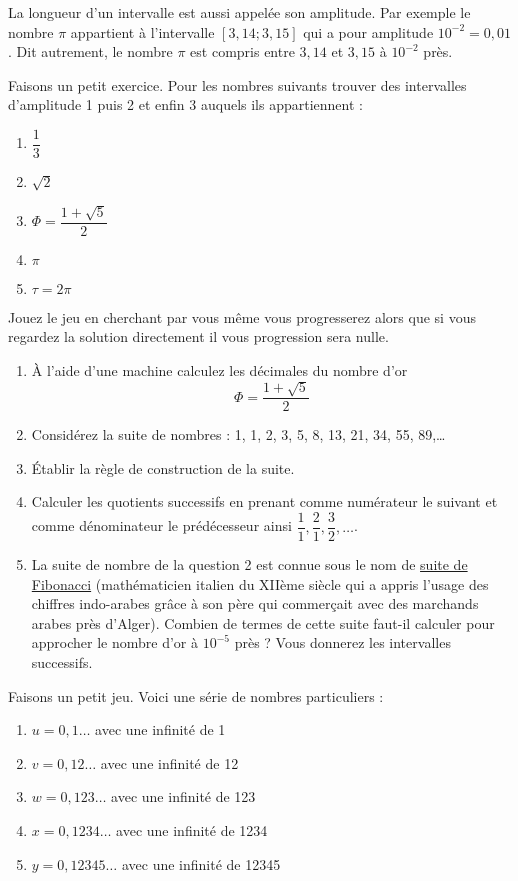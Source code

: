 \documentclass[11pt]{article}
\begin{document}
La longueur d'un intervalle est aussi appelée son amplitude. Par
exemple le nombre \(\pi\) appartient à l'intervalle \([3,14 ; 3,15]\)
qui a pour amplitude \(10^{-2} = 0,01\). Dit autrement, le nombre
\(\pi\) est compris entre \(3,14\) et \(3,15\) à \(10^{-2}\) près.

Faisons un petit exercice. Pour les nombres suivants trouver des
intervalles d'amplitude 1 puis 2 et enfin 3 auquels ils appartiennent :
\begin{enumerate}
\item \(\dfrac{1}{3}\)
\item \(\sqrt{2}\)
\item \(\Phi = \dfrac{1 + \sqrt{5}}{2}\)
\item \(\pi\)
\item \(\tau = 2\pi\)
\end{enumerate}

Jouez le jeu en cherchant par vous même vous progresserez alors que
si vous regardez la solution directement il vous progression sera
nulle.

\begin{enumerate}
\item À l'aide d'une machine calculez les décimales du nombre d'or
\[\Phi = \dfrac{1 + \sqrt{5}}{2}\]
\item Considérez la suite de nombres : 1, 1, 2, 3, 5, 8, 13, 21, 34,
55, 89,\ldots{}
\item Établir la règle de construction de la suite.
\item Calculer les quotients successifs en prenant comme numérateur le
suivant et comme dénominateur le prédécesseur ainsi
\(\dfrac{1}{1}, \dfrac{2}{1}, \dfrac{3}{2},\dots\).
\item La suite de nombre de la question 2 est connue sous le nom de
\href{https://fr.wikipedia.org/wiki/Suite\_de\_Fibonacci}{suite de Fibonacci} (mathématicien italien du XIIème siècle qui a
appris l'usage des chiffres indo-arabes grâce à son père qui
commerçait avec des marchands arabes près d'Alger). Combien de
termes de cette suite faut-il calculer pour approcher le nombre
d'or à \(10^{-5}\) près ? Vous donnerez les intervalles successifs.
\end{enumerate}

Faisons un petit jeu. Voici une série de nombres particuliers :
\begin{enumerate}
\item \(u = 0,1\dots\) avec une infinité de 1
\item \(v = 0,12\dots\) avec une infinité de 12
\item \(w = 0,123\dots\) avec une infinité de 123
\item \(x = 0,1234\dots\) avec une infinité de 1234
\item \(y = 0,12345\dots\) avec une infinité de 12345
\end{enumerate}
\end{document}
